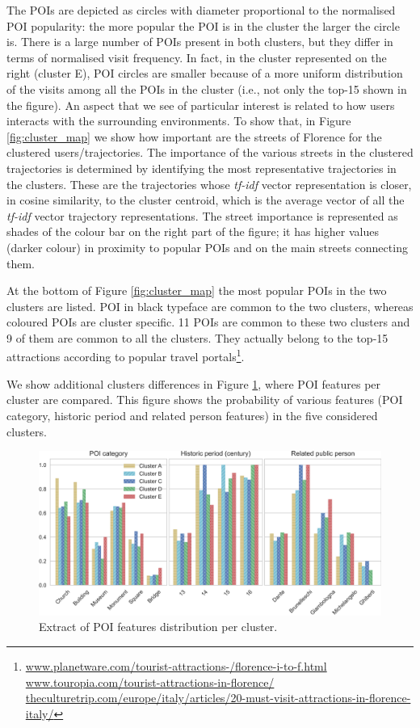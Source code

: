 The POIs are depicted as circles with diameter proportional to the normalised POI popularity:  the more popular the POI is in the cluster the larger the circle is. There is a large number of POIs present in both clusters, but they differ in terms of normalised visit frequency. In fact, in the cluster represented on the right (cluster E), POI circles are smaller because of a more uniform distribution of the visits among all the POIs in the cluster (i.e., not only the top-15 shown in the figure). 
An aspect that we see of particular interest is related to how users interacts with the surrounding environments. To show that, in Figure \ref{fig:cluster_map} we show how important are the streets of Florence for the clustered users/trajectories.
The importance of the various streets in the clustered trajectories is determined by identifying the most representative trajectories in the clusters. These are the trajectories whose \textit{tf-idf} vector representation is closer, in cosine similarity, to the cluster centroid, which is the average vector of all the \textit{tf-idf} vector trajectory representations. The street importance is represented as shades of the colour bar on the right part of the figure; it has higher values (darker colour) in proximity to popular POIs and on the main streets connecting them. 

At the bottom of Figure \ref{fig:cluster_map} the most popular POIs in the two clusters are listed. POI in black typeface are common to the two clusters, whereas coloured POIs are cluster specific. 11 POIs are common to these two clusters and 9 of them are common to all the clusters. They actually belong to the top-15 attractions according to popular travel portals\footnote{
	\url{www.planetware.com/tourist-attractions-/florence-i-to-f.html} \\  
	\url{www.touropia.com/tourist-attractions-in-florence/} \\ \url{theculturetrip.com/europe/italy/articles/20-must-visit-attractions-in-florence-italy/}
}.

We show additional clusters differences in Figure \ref{fig:cluster_poi}, where POI features per cluster are compared.
This figure shows the probability of various features (POI category, historic period and related person features) in the five considered clusters.

\begin{figure}
	\centering
	\includegraphics[width=1\linewidth]{cluster_comparison_poifeatures}
	\caption{Extract of POI features distribution per cluster.}
	\label{fig:cluster_poi}
\end{figure} 

